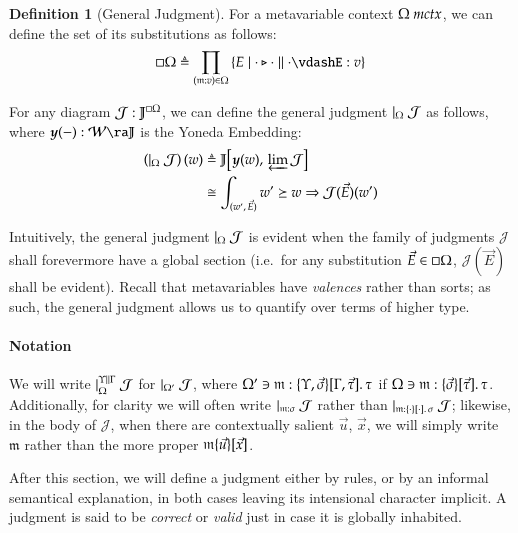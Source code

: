\documentclass[11pt]{article}
\theoremstyle{definition}
\newtheorem{definition}[thm]{Definition}
\theoremstyle{remark}
\numberwithin{equation}{section}
\def\IModeColorName{MidnightBlue}
\def\OModeColorName{Maroon}
\def\IModeColorName{Black}
\def\OModeColorName{Black}
\newcommand\IMode[1]{{\color{\IModeColorName}{#1}}}
\newcommand\OMode[1]{{\color{\OModeColorName}{#1}}}
\newcommand\GenJ[2]{\vert_{\IMode{#1}}\; #2}
\newcommand\HPGenJ[4]{\vert^{\IMode{#1}\parallel\IMode{#2}}_{\IMode{#3}}\; #4}
\newcommand\MkSet[1]{\left\{#1\right\}}
\newcommand\Member[2]{\IMode{#1}\in\IMode{#2}}
\newcommand\Of[2]{\IMode{#1}: \IMode{#2}}
\newcommand\MkValence[3]{%
  \ifthenelse{\equal{#1}{}}{}{%
    \{#1\}%
  }%
  \ifthenelse{\equal{#2}{}}{}{%
    [#2]%
  }.\, #3%
}
\newcommand\IsMetaCtx[1]{\IMode{#1}\ \textit{mctx}}
\newcommand\Lookup[3]{\IMode{#1}\ni\IMode{#2}:\OMode{#3}}
\newcommand\IsAbtUnmoded[5]{
  #1\triangleright%
  #2\parallel%
  #3\vdash%
  #4:\OMode{#5}%
}
\newcommand\MV[1]{\mathfrak{#1}}
\newcommand\MApp[3]{%
  #1
  \ifthenelse{\equal{#2}{}}{}{%
    \{#2\}%
  }%
  \ifthenelse{\equal{#3}{}}{}{%
    [#3]%
  }
}
\newcommand\Hom[3]{#1\!\left[#2,\,#3\right]\!}
\newcommand\Define[2]{\IMode{#1}\triangleq\OMode{#2}}
\newcommand\ADefine[2]{\IMode{#1}&\triangleq\OMode{#2}}
\newcommand\Yoneda[1]{\boldsymbol{y} (#1)}
\begin{document}
\begin{definition}[General Judgment]
  For a metavariable context $\IsMetaCtx{\Omega}$, we can define the set
  of its substitutions as follows:
  \[
    \Define{{\square\Omega}}{
      \prod_{(\MV{m}:v)\in\Omega}
        \MkSet{E\mid\IsAbtUnmoded{\cdot}{\cdot}{\cdot}{E}{v}}
    }
  \]

  For any diagram $\Of{\mathcal{J}}{\mathbb{J}^{\square\Omega}}$, we can define
  the general judgment $\GenJ{\Omega}{\mathcal{J}}$ as follows, where
  $\Of{\Yoneda{-}}{\mathcal{W}\ra\mathbb{J}}$ is the Yoneda Embedding:
  \begin{align*}
    \ADefine{
      \left(\GenJ{\Omega}{\mathcal{J}}\right)(w)
    }{
      \Hom{\mathbb{J}}{
        \Yoneda{w}
      }{
        \varprojlim\mathcal{J}
      }
    }\\
    &\cong
    \OMode{
      \int_{(w',\,\vec{E})}{{w'}\succeq{w}\Rightarrow{\mathcal{J}(\vec{E})(w')}}
    }
  \end{align*}

   Intuitively, the general judgment $\GenJ{\Omega}{\mathcal{J}}$ is evident
   when the family of judgments $\mathcal{J}$ shall forevermore have a global
   section (i.e.\ for any substitution $\Member{\vec{E}}{\square\Omega}$,
   $\mathcal{J}(\vec{E})$ shall be evident). Recall that metavariables have
   \emph{valences} rather than sorts; as such, the general judgment allows us
   to quantify over terms of higher type.

   \paragraph{Notation}

   We will write $\HPGenJ{\Upsilon}{\Gamma}{\Omega}{\mathcal{J}}$ for
   $\GenJ{\Omega'}{\mathcal{J}}$, where
   $\Lookup{\Omega'}{\MV{m}}{\MkValence{\Upsilon,\vec{\sigma}}{\Gamma,\vec{\tau}}{\tau}}$
   if $\Lookup{\Omega}{\MV{m}}{\MkValence{\vec{\sigma}}{\vec{\tau}}{\tau}}$.
   Additionally, for clarity we will often write
   $\GenJ{\MV{m}:\sigma}{\mathcal{J}}$ rather than
   $\GenJ{\MV{m}:\MkValence{\cdot}{\cdot}{\sigma}}{\mathcal{J}}$; likewise, in
   the body of $\mathcal{J}$, when there are contextually salient
   $\vec{u}$, $\vec{x}$, we will simply write $\MV{m}$ rather than the more proper
   $\MApp{\MV{m}}{\vec{u}}{\vec{x}}$.

\end{definition}


After this section, we will define a judgment either by rules, or by an
informal semantical explanation, in both cases leaving its intensional
character implicit. A judgment is said to be \emph{correct} or \emph{valid}
just in case it is globally inhabited.
\end{document}
